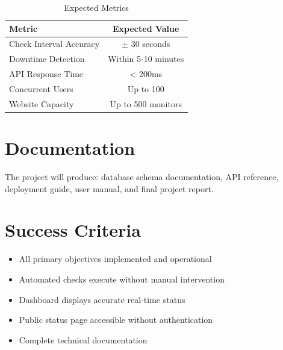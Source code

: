 \begin{table}[H]
    \centering
    \caption{Expected Metrics}
    \label{tab:expected-metrics}
    \begin{tabular}{lc}
        \toprule
        \textbf{Metric} & \textbf{Expected Value} \\
        \midrule
        Check Interval Accuracy & $\pm$ 30 seconds \\
        Downtime Detection & Within 5-10 minutes \\
        API Response Time & < 200ms \\
        Concurrent Users & Up to 100 \\
        Website Capacity & Up to 500 monitors \\
        \bottomrule
    \end{tabular}
\end{table}

\section{Documentation}

The project will produce: database schema documentation, API reference, deployment guide, user manual, and final project report.

\section{Success Criteria}

\begin{itemize}
    \item All primary objectives implemented and operational
    \item Automated checks execute without manual intervention
    \item Dashboard displays accurate real-time status
    \item Public status page accessible without authentication
    \item Complete technical documentation
\end{itemize}
